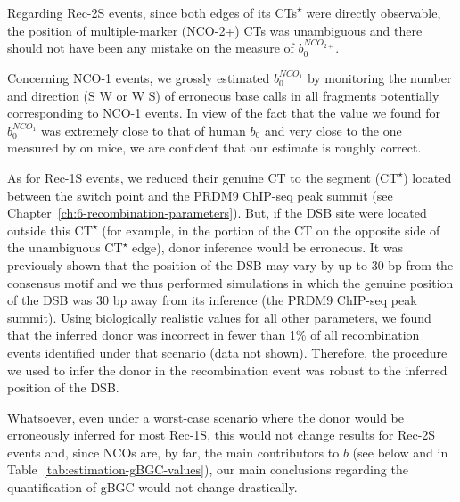 Regarding Rec-2S events, since both edges of its CTs\textsuperscript{$\star$} were directly observable, the position of multiple-marker (NCO-2+) CTs was unambiguous and there should not have been any mistake on the measure of $b_0^{NCO_{2+}}$.

Concerning NCO-1 events, we grossly estimated $b_0^{NCO_1}$ by monitoring the number and direction (S\textrightarrow{} W or W\textrightarrow{} S) of erroneous base calls in all fragments potentially corresponding to NCO-1 events.
In view of the fact that the value we found for $b_0^{NCO_1}$ was extremely close to that of human $b_0$ \citep{williams2015noncrossover,halldorsson2016rate} and very close to the one measured by \citet{li2018highresolution} on mice, we are confident that our estimate is roughly correct.

As for Rec-1S events, we reduced their genuine CT to the segment (CT\textsuperscript{$\star$}) located between the switch point and the PRDM9 ChIP-seq peak summit (see Chapter~\ref{ch:6-recombination-parameters}).
But, if the DSB site were located outside this CT\textsuperscript{$\star$} (for example, in the portion of the CT on the opposite side of the unambiguous CT\textsuperscript{$\star$} edge), donor inference would be erroneous.
It was previously shown that the position of the DSB may vary by up to 30 bp from the consensus motif \citep{lange2016landscape} and we thus performed simulations in which the genuine position of the DSB was 30 bp away from its inference (the PRDM9 ChIP-seq peak summit).
Using biologically realistic values for all other parameters, we found that the inferred donor was incorrect in fewer than 1\% of all recombination events identified under that scenario (data not shown).
Therefore, the procedure we used to infer the donor in the recombination event was robust to the inferred position of the DSB\@.

Whatsoever, even under a worst-case scenario where the donor would be erroneously inferred for most Rec-1S, this would not change results for Rec-2S events and, since NCOs are, by far, the main contributors to $b$ (see below and in Table~\ref{tab:estimation-gBGC-values}), our main conclusions regarding the quantification of gBGC would not change drastically.







